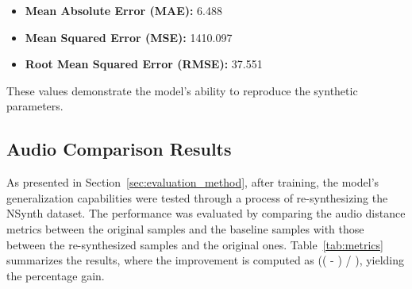 \documentclass[10pt,conference]{IEEEtran}
\begin{document}
\begin{itemize}
    \item \textbf{Mean Absolute Error (MAE):} 6.488
    \item \textbf{Mean Squared Error (MSE):} 1410.097
    \item \textbf{Root Mean Squared Error (RMSE):} 37.551
\end{itemize}

These values demonstrate the model’s ability to reproduce the synthetic parameters.

\subsection{Audio Comparison Results}





As presented in Section~\ref{sec:evaluation_method}, after training, the model’s generalization capabilities were tested through a process of re-synthesizing the NSynth dataset. The performance was evaluated by comparing the audio distance metrics between the original samples and the baseline samples with those between the re-synthesized samples and the original ones. Table~\ref{tab:metrics} summarizes the results, where the improvement is computed as (( - ) / ), yielding the percentage gain.
\end{document}
